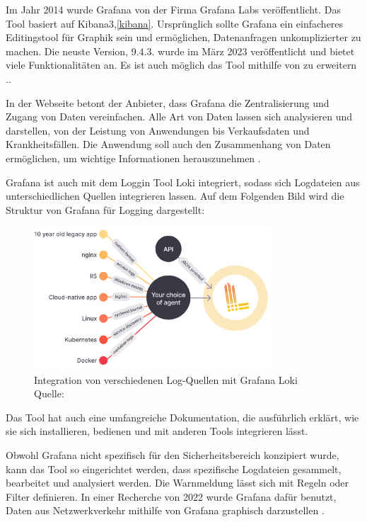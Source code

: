 Im Jahr 2014 wurde Grafana von der Firma Grafana Labs veröffentlicht. Das Tool basiert auf Kibana3,\ref{kibana}. Ursprünglich sollte Grafana ein einfacheres Editingstool für Graphik sein und ermöglichen, Datenanfragen unkomplizierter zu machen. Die neuste Version, 9.4.3. wurde im März 2023 veröffentlicht und bietet viele Funktionalitäten an. Es ist auch möglich das Tool mithilfe von    zu erweitern \citep{Oedegaard_historyGrafana}.. 

In der Webseite betont der Anbieter, dass Grafana die Zentralisierung und Zugang von Daten vereinfachen. Alle Art von Daten lassen sich analysieren und darstellen, von der Leistung von Anwendungen bis Verkaufsdaten und Krankheitsfällen. Die Anwendung soll auch den Zusammenhang von Daten ermöglichen, um wichtige Informationen herauszunehmen \citep{Grafana_Grafana}.

Grafana ist auch mit dem Loggin Tool Loki integriert, sodass sich Logdateien aus unterschiedlichen Quellen integrieren lassen. Auf dem Folgenden Bild wird die Struktur von Grafana für Logging dargestellt:

\begin{figure}[H]
   \centering
   \includegraphics[width=0.8\textwidth]{assets/2_p10.png}
   \caption{Integration von verschiedenen Log-Quellen mit Grafana Loki \\Quelle: \citep{Grafana_Logs}}
   \centering
\end{figure}

Das Tool hat auch eine umfangreiche Dokumentation, die ausführlich erklärt, wie sie sich installieren, bedienen und mit anderen Tools integrieren lässt. 

\newpage
Obwohl Grafana nicht spezifisch für den Sicherheitsbereich konzipiert wurde, kann das Tool so eingerichtet werden, dass spezifische Logdateien gesammelt, bearbeitet und analysiert werden. Die Warnmeldung lässt sich mit Regeln oder Filter definieren. In einer Recherche von 2022 wurde Grafana dafür benutzt, Daten aus Netzwerkverkehr mithilfe von Grafana graphisch darzustellen \citep{Manases_grafananetwork}. 

